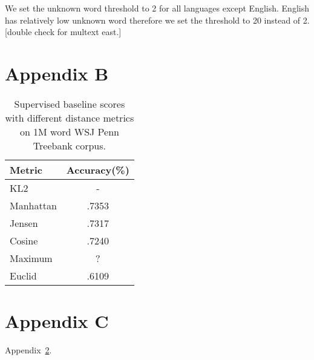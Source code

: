 We set the unknown word threshold to 2 for all languages except
English.  English has relatively low unknown word therefore we set the
threshold to 20 instead of 2.[double check for multext east.]

\section{Appendix B}
\label{app:dist1M}
\begin{table}[ht] \centering
\begin{tabular}{|l|c|}
\hline
Metric & Accuracy(\%) \\
\hline
KL2 & - \\
Manhattan & .7353\\ %
Jensen & .7317 \\ %
Cosine & .7240 \\ %
Maximum & ? \\
Euclid & .6109 \\ %
\hline
\end{tabular}
\caption{Supervised baseline scores with different 
distance metrics on 1M word WSJ Penn Treebank corpus.}
\label{tab:distscores1M}
\end{table}


\section{Appendix C}
\label{app:tags}
Appendix~\ref{app:tags}.
\begin{itemize}

\end{itemize}
